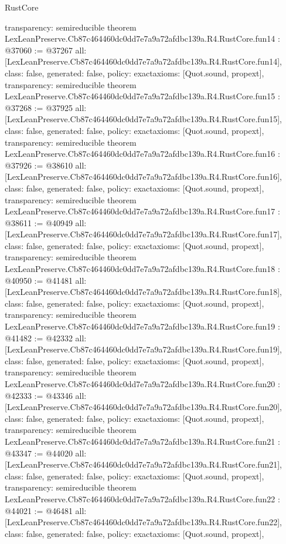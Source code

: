 \begin{lexlean}{RustCore}
\begin{coremodule}
{  transparency: semireducible
}
theorem LexLeanPreserve.Cb87c464460dc0dd7e7a9a72afdbc139a.R4.RustCore.fun14 : @37060 := @37267 {
  all: [LexLeanPreserve.Cb87c464460dc0dd7e7a9a72afdbc139a.R4.RustCore.fun14],
  class: false,
  generated: false,
  policy: exact{axioms: [Quot.sound, propext]},
  transparency: semireducible
}
theorem LexLeanPreserve.Cb87c464460dc0dd7e7a9a72afdbc139a.R4.RustCore.fun15 : @37268 := @37925 {
  all: [LexLeanPreserve.Cb87c464460dc0dd7e7a9a72afdbc139a.R4.RustCore.fun15],
  class: false,
  generated: false,
  policy: exact{axioms: [Quot.sound, propext]},
  transparency: semireducible
}
theorem LexLeanPreserve.Cb87c464460dc0dd7e7a9a72afdbc139a.R4.RustCore.fun16 : @37926 := @38610 {
  all: [LexLeanPreserve.Cb87c464460dc0dd7e7a9a72afdbc139a.R4.RustCore.fun16],
  class: false,
  generated: false,
  policy: exact{axioms: [Quot.sound, propext]},
  transparency: semireducible
}
theorem LexLeanPreserve.Cb87c464460dc0dd7e7a9a72afdbc139a.R4.RustCore.fun17 : @38611 := @40949 {
  all: [LexLeanPreserve.Cb87c464460dc0dd7e7a9a72afdbc139a.R4.RustCore.fun17],
  class: false,
  generated: false,
  policy: exact{axioms: [Quot.sound, propext]},
  transparency: semireducible
}
theorem LexLeanPreserve.Cb87c464460dc0dd7e7a9a72afdbc139a.R4.RustCore.fun18 : @40950 := @41481 {
  all: [LexLeanPreserve.Cb87c464460dc0dd7e7a9a72afdbc139a.R4.RustCore.fun18],
  class: false,
  generated: false,
  policy: exact{axioms: [Quot.sound, propext]},
  transparency: semireducible
}
theorem LexLeanPreserve.Cb87c464460dc0dd7e7a9a72afdbc139a.R4.RustCore.fun19 : @41482 := @42332 {
  all: [LexLeanPreserve.Cb87c464460dc0dd7e7a9a72afdbc139a.R4.RustCore.fun19],
  class: false,
  generated: false,
  policy: exact{axioms: [Quot.sound, propext]},
  transparency: semireducible
}
theorem LexLeanPreserve.Cb87c464460dc0dd7e7a9a72afdbc139a.R4.RustCore.fun20 : @42333 := @43346 {
  all: [LexLeanPreserve.Cb87c464460dc0dd7e7a9a72afdbc139a.R4.RustCore.fun20],
  class: false,
  generated: false,
  policy: exact{axioms: [Quot.sound, propext]},
  transparency: semireducible
}
theorem LexLeanPreserve.Cb87c464460dc0dd7e7a9a72afdbc139a.R4.RustCore.fun21 : @43347 := @44020 {
  all: [LexLeanPreserve.Cb87c464460dc0dd7e7a9a72afdbc139a.R4.RustCore.fun21],
  class: false,
  generated: false,
  policy: exact{axioms: [Quot.sound, propext]},
  transparency: semireducible
}
theorem LexLeanPreserve.Cb87c464460dc0dd7e7a9a72afdbc139a.R4.RustCore.fun22 : @44021 := @46481 {
  all: [LexLeanPreserve.Cb87c464460dc0dd7e7a9a72afdbc139a.R4.RustCore.fun22],
  class: false,
  generated: false,
  policy: exact{axioms: [Quot.sound, propext]},
}
\end{coremodule}
\end{lexlean}
